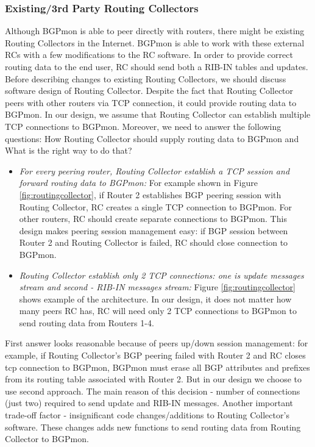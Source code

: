\subsubsection{Existing/3rd Party Routing Collectors}
Although BGPmon is able to peer directly with routers, there might be existing Routing Collectors in the Internet. BGPmon is able to work with these external RCs with a few modifications to the RC software. In order to provide correct routing data to the end user, RC should send both a RIB-IN tables and updates. Before describing changes to existing Routing Collectors, we should discuss software design of Routing Collector. Despite the fact that Routing Collector peers with other routers via TCP connection, it could provide routing data to BGPmon. In our design, we assume that Routing Collector can establish multiple TCP connections to BGPmon. Moreover, we need to answer the following questions: How Routing Collector should supply routing data to BGPmon and What is the right way to do that?
\begin{itemize}
	\item{\emph{For every peering router, Routing Collector establish a TCP session and forward routing data to BGPmon:} For example shown in Figure \ref{fig:routingcollector}, if Router 2 establishes BGP peering session with Routing Collector, RC creates a single TCP connection to BGPmon. For other routers, RC should create separate connections to BGPmon. This design makes peering session management easy: if BGP session between Router 2 and Routing Collector is failed, RC should close connection to BGPmon. }
	\item{\emph{Routing Collector establish only 2 TCP connections: one is update messages stream and second - RIB-IN messages stream:} Figure \ref{fig:routingcollector} shows example of the architecture. In our design, it does not matter how many peers RC has, RC will need only 2 TCP connections to BGPmon to send routing data from Routers 1-4. }
\end{itemize}



First answer looks reasonable because of peers up/down session management: for example, if Routing Collector's BGP peering failed with Router 2 and RC closes tcp connection to BGPmon, BGPmon must erase all BGP attributes and prefixes from its routing table associated with Router 2. But in our design we choose to use second approach. The main reason of this decision - number of connections (just two) required to send update and RIB-IN messages. Another important trade-off factor - insignificant code changes/additions to Routing Collector's software. These changes adds new functions to send routing data from Routing Collector to BGPmon. 


